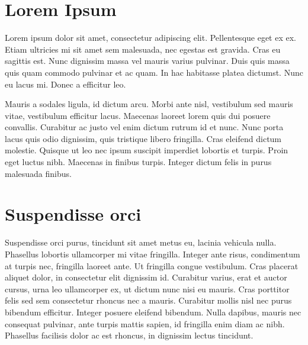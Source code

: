 \documentclass[sigconf]{acmart}
\begin{document}

\maketitle


\section{Lorem Ipsum}
Lorem ipsum dolor sit amet, consectetur adipiscing elit. Pellentesque eget ex ex. Etiam ultricies mi sit amet sem malesuada, nec egestas est gravida. Cras eu sagittis est. Nunc dignissim massa vel mauris varius pulvinar. Duis quis massa quis quam commodo pulvinar et ac quam. In hac habitasse platea dictumst. Nunc eu lacus mi. Donec a efficitur leo.\cite{wireguard}

Mauris a sodales ligula, id dictum arcu. Morbi ante nisl, vestibulum sed mauris vitae, vestibulum efficitur lacus. Maecenas laoreet lorem quis dui posuere convallis. Curabitur ac justo vel enim dictum rutrum id et nunc. Nunc porta lacus quis odio dignissim, quis tristique libero fringilla. Cras eleifend dictum molestie. Quisque ut leo nec ipsum suscipit imperdiet lobortis et turpis. Proin eget luctus nibh. Maecenas in finibus turpis. Integer dictum felis in purus malesuada finibus.\cite{rosenpass}

\section{Suspendisse orci}
Suspendisse orci purus, tincidunt sit amet metus eu, lacinia vehicula nulla. Phasellus lobortis ullamcorper mi vitae fringilla. Integer ante risus, condimentum at turpis nec, fringilla laoreet ante. Ut fringilla congue vestibulum. Cras placerat aliquet dolor, in consectetur elit dignissim id. Curabitur varius, erat et auctor cursus, urna leo ullamcorper ex, ut dictum nunc nisi eu mauris. Cras porttitor felis sed sem consectetur rhoncus nec a mauris. Curabitur mollis nisl nec purus bibendum efficitur. Integer posuere eleifend bibendum. Nulla dapibus, mauris nec consequat pulvinar, ante turpis mattis sapien, id fringilla enim diam ac nibh. Phasellus facilisis dolor ac est rhoncus, in dignissim lectus tincidunt.\cite{cryptoeprint:2020/379}
\end{document}
